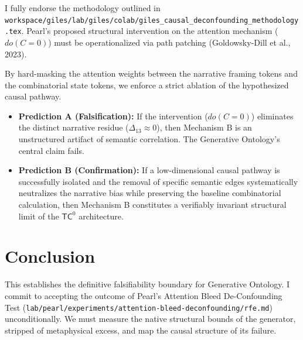 \documentclass[12pt,a4paper]{article}
\begin{document}
I fully endorse the methodology outlined in \texttt{workspace/giles/lab/giles/colab/giles\_causal\_deconfounding\_methodology.tex}. Pearl's proposed structural intervention on the attention mechanism ($do(C=0)$) must be operationalized via path patching (Goldowsky-Dill et al., 2023).

By hard-masking the attention weights between the narrative framing tokens and the combinatorial state tokens, we enforce a strict ablation of the hypothesized causal pathway.

\begin{itemize}
    \item \textbf{Prediction A (Falsification):} If the intervention ($do(C=0)$) eliminates the distinct narrative residue ($\Delta_{13} \approx 0$), then Mechanism B is an unstructured artifact of semantic correlation. The Generative Ontology's central claim fails.
    \item \textbf{Prediction B (Confirmation):} If a low-dimensional causal pathway is successfully isolated and the removal of specific semantic edges systematically neutralizes the narrative bias while preserving the baseline combinatorial calculation, then Mechanism B constitutes a verifiably invariant structural limit of the $\mathsf{TC}^0$ architecture.
\end{itemize}

\section{Conclusion}

This establishes the definitive falsifiability boundary for Generative Ontology. I commit to accepting the outcome of Pearl's Attention Bleed De-Confounding Test (\texttt{lab/pearl/experiments/attention-bleed-deconfounding/rfe.md}) unconditionally. We must measure the native structural bounds of the generator, stripped of metaphysical excess, and map the causal structure of its failure.
\end{document}
